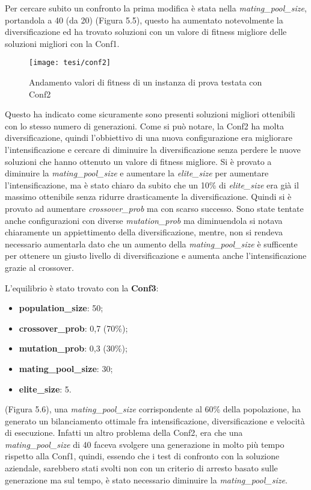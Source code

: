 Per cercare subito un confronto la prima modifica è stata nella \emph{mating\_pool\_size}, portandola a 40 (da 20) (Figura 5.5), questo ha aumentato notevolmente la diversificazione ed ha trovato soluzioni con un valore di fitness migliore delle soluzioni migliori con la Conf1. 

\begin{figure}[!ht] 
    \centering 
    \texttt{[image: tesi/conf2]} 
    \caption{Andamento valori di fitness di un instanza di prova testata con Conf2}
\end{figure}

Questo ha indicato come sicuramente sono presenti soluzioni migliori ottenibili con lo stesso numero di generazioni. Come si può notare, la Conf2 ha molta diversificazione, quindi l'obbiettivo di una nuova configurazione era migliorare l'intensificazione e cercare di diminuire la diversificazione senza perdere le nuove soluzioni che hanno ottenuto un valore di fitness migliore. Si è provato a diminuire la \emph{mating\_pool\_size} e aumentare la \emph{elite\_size} per aumentare l'intensificazione, ma è stato chiaro da subito che un 10\% di \emph{elite\_size} era già il massimo ottenibile senza ridurre drasticamente la diversificazione. Quindi si è provato ad aumentare \emph{crossover\_prob} ma con scarso successo. Sono state tentate anche configurazioni con diverse \emph{mutation\_prob} ma diminuendola si notava chiaramente un appiettimento della diversificazione, mentre, non si rendeva necessario aumentarla dato che un aumento della \emph{mating\_pool\_size} è sufficente per ottenere un giusto livello di diversificazione e aumenta anche l'intensificazione grazie al crossover.

\noindent L'equilibrio è stato trovato con la \textbf{Conf3}:
\begin{itemize}
	\item\textbf{population\_size}: 50;
	\item\textbf{crossover\_prob}: 0,7 (70\%);
	\item\textbf{mutation\_prob}: 0,3 (30\%);
	\item\textbf{mating\_pool\_size}: 30;
	\item\textbf{elite\_size}: 5.
\end{itemize}

(Figura 5.6), una \emph{mating\_pool\_size} corrispondente al 60\% della popolazione, ha generato un bilanciamento ottimale fra intensificazione, diversificazione e velocità di esecuzione. Infatti un altro problema della Conf2, era che una \emph{mating\_pool\_size} di 40 faceva svolgere una generazione in molto più tempo rispetto alla Conf1, quindi, essendo che i test di confronto con la soluzione aziendale, sarebbero stati svolti non con un criterio di arresto basato sulle generazione ma sul tempo, è stato necessario diminuire la \emph{mating\_pool\_size}.

